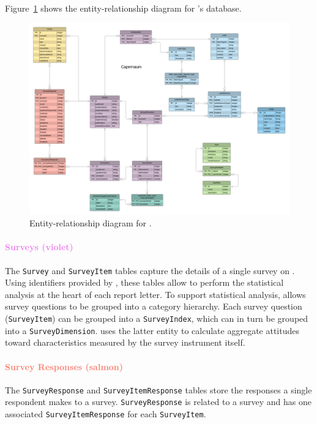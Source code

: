 \documentclass{article}
\begin{document}
Figure~\ref{fig:erd} shows the entity-relationship diagram for \caper's \pg{} database.
\begin{figure}
  \centering
  \includegraphics[width=\textwidth]{data-model}
  \caption{Entity-relationship diagram for \caper.}
  \label{fig:erd}
\end{figure}

\paragraph{\textcolor{Violet}{Surveys (violet)}}

The \texttt{Survey} and \texttt{SurveyItem} tables
capture the details of a single survey on \qual.
Using identifiers provided by \qual,
these tables allow \caper{} to perform the statistical analysis at the heart of each report letter.
To support statistical analysis,
\caper{} allows survey questions to be grouped into a category hierarchy.
Each survey question (\texttt{SurveyItem})
can be grouped into a \texttt{SurveyIndex},
which can in turn be grouped into a \texttt{SurveyDimension}.
\caper{} uses the latter entity to calculate aggregate attitudes
toward characteristics measured by the survey instrument itself.

\paragraph{\textcolor{Salmon}{Survey Responses (salmon)}}

The \texttt{Survey\-Res\-ponse}
and \texttt{Survey\-Item\-Res\-ponse}
tables store the responses a single respondent
makes to a survey.
\texttt{Survey\-Res\-ponse} is related to a survey
and has one associated \texttt{SurveyItemResponse}
for each \texttt{SurveyItem}.
\end{document}
